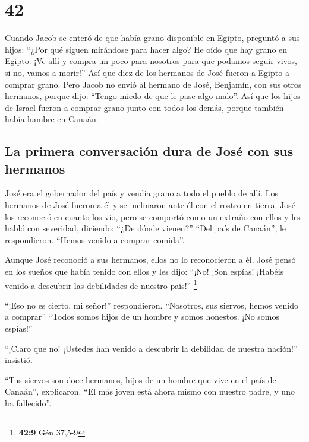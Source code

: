 \hypertarget{section-41}{%
\section{42}\label{section-41}}

 Cuando Jacob se enteró de que había grano disponible en
Egipto, preguntó a sus hijos: ``¿Por qué siguen mirándose para hacer
algo?  He oído que hay grano en Egipto. ¡Ve allí y compra
un poco para nosotros para que podamos seguir vivos, si no, vamos a
morir!''  Así que diez de los hermanos de José fueron a
Egipto a comprar grano.  Pero Jacob no envió al hermano de
José, Benjamín, con sus otros hermanos, porque dijo: ``Tengo miedo de
que le pase algo malo''.  Así que los hijos de Israel
fueron a comprar grano junto con todos los demás, porque también había
hambre en Canaán.

\hypertarget{la-primera-conversaciuxf3n-dura-de-josuxe9-con-sus-hermanos}{%
\subsection{La primera conversación dura de José con sus
hermanos}\label{la-primera-conversaciuxf3n-dura-de-josuxe9-con-sus-hermanos}}

 José era el gobernador del país y vendía grano a todo el
pueblo de allí. Los hermanos de José fueron a él y se inclinaron ante él
con el rostro en tierra.  José los reconoció en cuanto los
vio, pero se comportó como un extraño con ellos y les habló con
severidad, diciendo: ``¿De dónde vienen?'' ``Del país de Canaán'', le
respondieron. ``Hemos venido a comprar comida''.

 Aunque José reconoció a sus hermanos, ellos no lo
reconocieron a él.  José pensó en los sueños que había
tenido con ellos y les dijo: ``¡No! ¡Son espías! ¡Habéis venido a
descubrir las debilidades de nuestro país!'' \footnote{\textbf{42:9} Gén
  37,5-9}

 ``¡Eso no es cierto, mi señor!'' respondieron.
``Nosotros, sus siervos, hemos venido a comprar'' 
``Todos somos hijos de un hombre y somos honestos. ¡No somos espías!''

 ``¡Claro que no! ¡Ustedes han venido a descubrir la
debilidad de nuestra nación!'' insistió.

 ``Tus siervos son doce hermanos, hijos de un hombre que
vive en el país de Canaán'', explicaron. ``El más joven está ahora mismo
con nuestro padre, y uno ha fallecido''.


